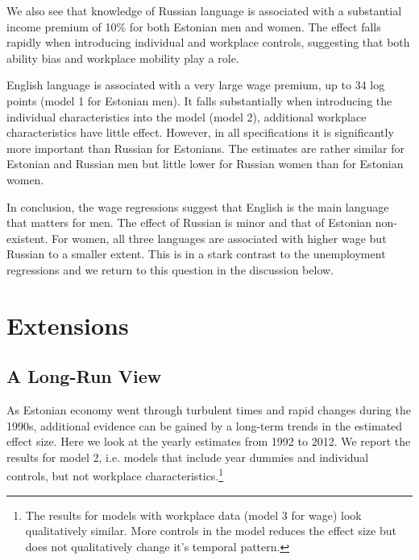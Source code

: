 \documentclass[12pt, a4paper]{article}
\def\tenpc{$^{\ast}$}
\def\fivepc{$^{\ast\ast}$}
\def\onepc{$^{\ast\ast\ast}$}
\newcommand{\legend}{\normalsize{Significance levels:\hspace{1em} \tenpc : 10\% \hspace{1em} \fivepc : 5\% \hspace{1em} \onepc : 1\% \normalsize}}
\newcommand{\modelTwo}{age, age\textsuperscript{2}, education, marriage, number of children, inter-ethnic household}
\newcommand{\modelThreeAdd}{industry, occupation, ownership type of company, number of workers in company, working in the public sector, experience in company}
\newcommand{\restrictions}{The sample period is from year 2000 to year 2012. Sample is limited to persons
	25-55
         
 year old.}
\begin{document}
\begin{table}[htbp]
\begin{center}
	\end{center}
\end{table}

We also see that knowledge of Russian language is associated with a
substantial income premium of 10\% for both Estonian men and women.
The effect falls rapidly when introducing
individual and workplace controls, suggesting that both ability bias
and workplace mobility play a role.

English language is associated with a very large
wage premium, up to 34 log points (model 1 for
Estonian men). It falls substantially when introducing the
individual characteristics into the model (model 2), additional
workplace characteristics have little effect.  However, in all
specifications it is
significantly more
important than Russian for Estonians. The estimates are rather
similar for Estonian and Russian men but little lower for Russian
women than for Estonian women.

In conclusion, the wage regressions suggest that English is the main
language that matters for men.  The effect of Russian is minor and
that of Estonian non-existent.  For women, all three languages are
associated with higher wage but Russian to a smaller extent.
This is in a stark contrast to the unemployment regressions and we return to
this question in the discussion below.


\section{Extensions}
\label{sec:extensions}

\subsection{A Long-Run View}
\label{sec:long-run}                           

As Estonian economy went through turbulent times and rapid changes
during the 1990s, additional evidence can be gained by a long-term
trends in the estimated effect size.  Here we look at the yearly estimates from 1992 to 2012.
We report the results for model 2, i.e. models that include year
dummies and individual controls, but not workplace
characteristics.\footnote{The results for models with workplace data (model
  3 for wage)
  look qualitatively similar.  More controls in the model reduces the effect size but does not qualitatively
  change it's temporal pattern.}
\end{document}
